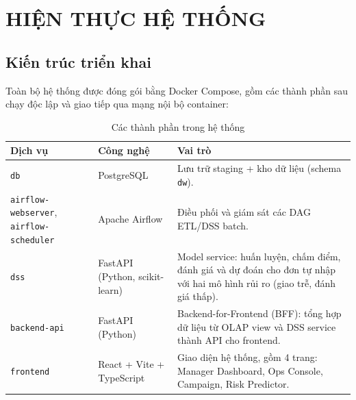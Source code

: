 \section{HIỆN THỰC HỆ THỐNG}

\subsection{Kiến trúc triển khai}
\hspace{1cm}
Toàn bộ hệ thống được đóng gói bằng Docker Compose, gồm các thành phần sau chạy độc lập và giao tiếp qua mạng
nội bộ container:

\begin{table}[H]
\centering
\caption{Các thành phần trong hệ thống}
\begin{tabular}{@{}>{\raggedright\arraybackslash}p{4.5cm}>{\raggedright\arraybackslash}p{4cm}>{\raggedright\arraybackslash}p{8cm}@{}}
\toprule
\textbf{Dịch vụ} & \textbf{Công nghệ} & \textbf{Vai trò} \\
\midrule
\texttt{db} & PostgreSQL & Lưu trữ staging + kho dữ liệu (schema \texttt{dw}). \\
\texttt{airflow-\allowbreak webserver}, \newline \texttt{airflow-\allowbreak scheduler} & Apache Airflow & Điều phối và giám
sát các DAG ETL/DSS batch. \\
\texttt{dss} & FastAPI (Python, scikit-learn) & Model service: huấn luyện, chấm điểm,
đánh giá và dự đoán cho đơn tự nhập với hai mô hình rủi ro (giao trễ, đánh giá thấp). \\
\texttt{backend-api} & FastAPI (Python) & Backend-for-Frontend (BFF): tổng hợp dữ liệu từ
OLAP view và DSS service thành API cho frontend. \\
\texttt{frontend} & React + Vite + TypeScript & Giao diện hệ thống, gồm 4 trang: Manager Dashboard, Ops Console, Campaign, Risk Predictor. \\
\bottomrule
\end{tabular}
\end{table}



